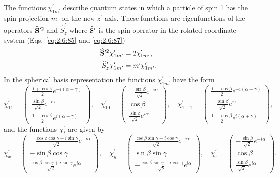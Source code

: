 The functions $\chi_{1 m^{\prime}}^{\prime}$ describe quantum states in which a particle of spin 1 has the spin projection $m^{\prime}$ on the new $z^{\prime}$-axis. These functions are eigenfunctions of the operators $\widehat{\mathbf{S}}^{\prime 2}$ and $\widehat{S}_{z}^{\prime}$ where $\widehat{\mathbf{S}}^{\prime}$ is the spin operator in the rotated coordinate system (Eqs.~\eqref{eq:2:6:85} and \eqref{eq:2:6:87})
\begin{align}
\widehat{\mathbf{S}}^{\prime 2} \chi_{1 m^{\prime}}^{\prime} & =2 \chi_{1 m^{\prime}}^{\prime}, \label{eq:6:3:35}\\
\widehat{S}_{z}^{\prime} \chi_{1 m^{\prime}}^{\prime} & =m^{\prime} \chi_{1 m^{\prime}}^{\prime} . \notag
\end{align}
In the spherical basis representation the functions $\chi_{1 m^{\prime}}^{\prime}$ have the form
\begin{equation}
\chi_{11}^{\prime}=\begin{pmatrix}
\frac{1+\cos \beta}{2} e^{-i(\alpha+\gamma)} \\
\frac{\sin \beta}{\sqrt{2}} e^{-i \gamma} \\
\frac{1-\cos \beta}{2} e^{i(\alpha-\gamma)}
\end{pmatrix}, \quad \chi_{10}^{\prime}=\begin{pmatrix}
-\frac{\sin \beta}{\sqrt{2}} e^{-i \alpha} \\
\cos \beta \\
\frac{\sin \beta}{\sqrt{2}} e^{i \alpha}
\end{pmatrix}, \quad \chi_{1-1}^{\prime}=\begin{pmatrix}
\frac{1-\cos \beta}{2} e^{-i(\alpha-\gamma)} \\
-\frac{\sin \beta}{\sqrt{2}} e^{i \gamma} \\
\frac{1+\cos \beta}{2} e^{i(\alpha+\gamma)}
\end{pmatrix}, \label{eq:6:3:36}
\end{equation}
and the functions $\chi_{i}^{\prime}$ are given by
\begin{equation}
\chi_{x}^{\prime}=\begin{pmatrix}
-\frac{\cos \beta \cos \gamma-i \sin \gamma}{\sqrt{2}} e^{-i \alpha} \\
-\sin \beta \cos \gamma \\
\frac{\cos \beta \cos \gamma+i \sin \gamma}{\sqrt{2}} e^{i \alpha}
\end{pmatrix}, \quad \chi_{y}^{\prime}=\begin{pmatrix}
\frac{\cos \beta \sin \gamma+i \cos \gamma}{\sqrt{2}} e^{-i \alpha} \\
\sin \beta \sin \gamma \\
-\frac{\cos \beta \sin \gamma-i \cos \gamma}{\sqrt{2}} e^{i \alpha}
\end{pmatrix}, \quad \chi_{z}^{\prime}=\begin{pmatrix}
-\frac{\sin \beta}{\sqrt{2}} e^{-i \alpha} \\
\cos \beta \\
\frac{\sin \beta}{\sqrt{2}} e^{i \alpha}
\end{pmatrix} . \label{eq:6:3:37}
\end{equation}
